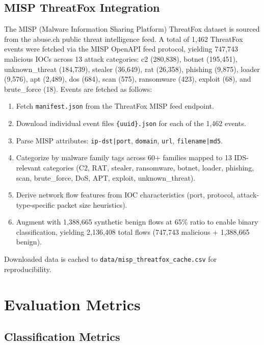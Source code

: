 \documentclass[12pt, letterpaper, oneside]{report}
\begin{document}
\subsection{MISP ThreatFox Integration}

The MISP (Malware Information Sharing Platform) ThreatFox dataset is sourced from the abuse.ch public threat intelligence feed. A total of 1,462 ThreatFox events were fetched via the MISP OpenAPI feed protocol, yielding 747,743 malicious IOCs across 13 attack categories: c2 (280,838), botnet (195,451), unknown\_threat (184,739), stealer (36,649), rat (26,358), phishing (9,875), loader (9,576), apt (2,489), dos (684), scan (575), ransomware (423), exploit (68), and brute\_force (18). Events are fetched as follows:

\begin{enumerate}
    \item Fetch \texttt{manifest.json} from the ThreatFox MISP feed endpoint.
    \item Download individual event files \texttt{\{uuid\}.json} for each of the 1,462 events.
    \item Parse MISP attributes: \texttt{ip-dst|port}, \texttt{domain}, \texttt{url}, \texttt{filename|md5}.
    \item Categorize by malware family tags across 60+ families mapped to 13 IDS-relevant categories (C2, RAT, stealer, ransomware, botnet, loader, phishing, scan, brute\_force, DoS, APT, exploit, unknown\_threat).
    \item Derive network flow features from IOC characteristics (port, protocol, attack-type-specific packet size heuristics).
    \item Augment with 1,388,665 synthetic benign flows at 65\% ratio to enable binary classification, yielding 2,136,408 total flows (747,743 malicious + 1,388,665 benign).
\end{enumerate}

Downloaded data is cached to \texttt{data/misp\_threatfox\_cache.csv} for reproducibility.


\section{Evaluation Metrics}
\label{sec:eval_metrics}

\subsection{Classification Metrics}
\end{document}
